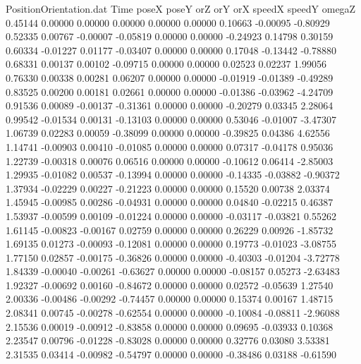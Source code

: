 \begin{filecontents}{PositionOrientation.dat}
Time poseX poseY orZ orY orX speedX speedY omegaZ
   0.45144    0.00000    0.00000     0.00000    0.00000    0.00000    0.10663   -0.00095   -0.80929
   0.52335    0.00767   -0.00007    -0.05819    0.00000    0.00000   -0.24923    0.14798    0.30159
   0.60334   -0.01227    0.01177    -0.03407    0.00000    0.00000    0.17048   -0.13442   -0.78880
   0.68331    0.00137    0.00102    -0.09715    0.00000    0.00000    0.02523    0.02237    1.99056
   0.76330    0.00338    0.00281     0.06207    0.00000    0.00000   -0.01919   -0.01389   -0.49289
   0.83525    0.00200    0.00181     0.02661    0.00000    0.00000   -0.01386   -0.03962   -4.24709
   0.91536    0.00089   -0.00137    -0.31361    0.00000    0.00000   -0.20279    0.03345    2.28064
   0.99542   -0.01534    0.00131    -0.13103    0.00000    0.00000    0.53046   -0.01007   -3.47307
   1.06739    0.02283    0.00059    -0.38099    0.00000    0.00000   -0.39825    0.04386    4.62556
   1.14741   -0.00903    0.00410    -0.01085    0.00000    0.00000    0.07317   -0.04178    0.95036
   1.22739   -0.00318    0.00076     0.06516    0.00000    0.00000   -0.10612    0.06414   -2.85003
   1.29935   -0.01082    0.00537    -0.13994    0.00000    0.00000   -0.14335   -0.03882   -0.90372
   1.37934   -0.02229    0.00227    -0.21223    0.00000    0.00000    0.15520    0.00738    2.03374
   1.45945   -0.00985    0.00286    -0.04931    0.00000    0.00000    0.04840   -0.02215    0.46387
   1.53937   -0.00599    0.00109    -0.01224    0.00000    0.00000   -0.03117   -0.03821    0.55262
   1.61145   -0.00823   -0.00167     0.02759    0.00000    0.00000    0.26229    0.00926   -1.85732
   1.69135    0.01273   -0.00093    -0.12081    0.00000    0.00000    0.19773   -0.01023   -3.08755
   1.77150    0.02857   -0.00175    -0.36826    0.00000    0.00000   -0.40303   -0.01204   -3.72778
   1.84339   -0.00040   -0.00261    -0.63627    0.00000    0.00000   -0.08157    0.05273   -2.63483
   1.92327   -0.00692    0.00160    -0.84672    0.00000    0.00000    0.02572   -0.05639    1.27540
   2.00336   -0.00486   -0.00292    -0.74457    0.00000    0.00000    0.15374    0.00167    1.48715
   2.08341    0.00745   -0.00278    -0.62554    0.00000    0.00000   -0.10084   -0.08811   -2.96088
   2.15536    0.00019   -0.00912    -0.83858    0.00000    0.00000    0.09695   -0.03933    0.10368
   2.23547    0.00796   -0.01228    -0.83028    0.00000    0.00000    0.32776    0.03080    3.53381
   2.31535    0.03414   -0.00982    -0.54797    0.00000    0.00000   -0.38486    0.03188   -0.61590

\end{filecontents}
